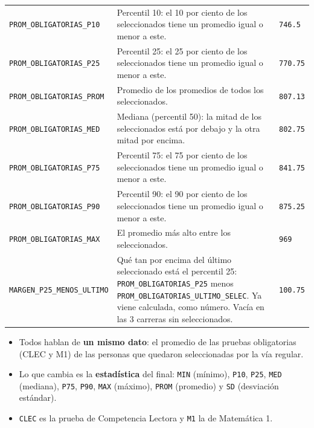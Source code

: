 \documentclass[10.5pt]{article}
\begin{document}
\begin{xltabular}{\linewidth}{@{}p{4.5cm} >{\raggedright\arraybackslash}X p{3.4cm}@{}}
\texttt{PROM\_\allowbreak{}OBLIGATORIAS\_\allowbreak{}P10} & Percentil 10: el 10 por ciento de los seleccionados tiene un promedio igual o menor a este. & \texttt{746.5} \\
\texttt{PROM\_\allowbreak{}OBLIGATORIAS\_\allowbreak{}P25} & Percentil 25: el 25 por ciento de los seleccionados tiene un promedio igual o menor a este. & \texttt{770.75} \\
\texttt{PROM\_\allowbreak{}OBLIGATORIAS\_\allowbreak{}PROM} & Promedio de los promedios de todos los seleccionados. & \texttt{807.13} \\
\texttt{PROM\_\allowbreak{}OBLIGATORIAS\_\allowbreak{}MED} & Mediana (percentil 50): la mitad de los seleccionados está por debajo y la otra mitad por encima. & \texttt{802.75} \\
\texttt{PROM\_\allowbreak{}OBLIGATORIAS\_\allowbreak{}P75} & Percentil 75: el 75 por ciento de los seleccionados tiene un promedio igual o menor a este. & \texttt{841.75} \\
\texttt{PROM\_\allowbreak{}OBLIGATORIAS\_\allowbreak{}P90} & Percentil 90: el 90 por ciento de los seleccionados tiene un promedio igual o menor a este. & \texttt{875.25} \\
\texttt{PROM\_\allowbreak{}OBLIGATORIAS\_\allowbreak{}MAX} & El promedio más alto entre los seleccionados. & \texttt{969} \\
\texttt{MARGEN\_\allowbreak{}P25\_\allowbreak{}MENOS\_\allowbreak{}ULTIMO} & Qué tan por encima del último seleccionado está el percentil 25: \texttt{PROM\_\allowbreak{}OBLIGATORIAS\_\allowbreak{}P25} menos \texttt{PROM\_\allowbreak{}OBLIGATORIAS\_\allowbreak{}ULTIMO\_\allowbreak{}SELEC}. Ya viene calculada, como número. Vacía en las 3 carreras sin seleccionados. & \texttt{100.75} \\
\end{xltabular}

\begin{estrategiabox}
\begin{itemize}[leftmargin=1.1em,itemsep=2pt,topsep=2pt]
\item Todos hablan de \textbf{un mismo dato}: el promedio de las pruebas obligatorias (CLEC y M1) de las personas que quedaron seleccionadas por la vía regular.
\item Lo que cambia es la \textbf{estadística} del final: \texttt{MIN} (mínimo), \texttt{P10}, \texttt{P25}, \texttt{MED} (mediana), \texttt{P75}, \texttt{P90}, \texttt{MAX} (máximo), \texttt{PROM} (promedio) y \texttt{SD} (desviación estándar).
\item \texttt{CLEC} es la prueba de Competencia Lectora y \texttt{M1} la de Matemática 1.
\end{itemize}
\end{estrategiabox}
\end{document}
